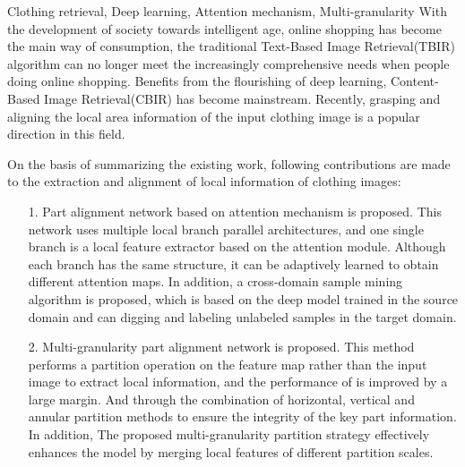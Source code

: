 \documentclass[figurelist,tablelist,algorithmlist,nomlist,masters]{Style/seuthesix}
\begin{document}
\begin{englishabstract}{Clothing retrieval, Deep learning, Attention mechanism, Multi-granularity}
  With the development of society towards intelligent age, online shopping has become the main way of consumption, the traditional Text-Based Image Retrieval(TBIR)
  algorithm can no longer meet the increasingly comprehensive needs when people doing online shopping. Benefits from the flourishing of deep learning, 
  Content-Based Image Retrieval(CBIR) has become mainstream. Recently, grasping and aligning the local area information of the input  clothing image is a 
  popular direction in this field. 
  
  On the basis of summarizing the existing work, following contributions are made to the extraction and alignment of local information 
  of clothing images:
  \begin{itemize}
    \item[1.]Part alignment network based on attention mechanism is proposed. This network uses multiple local branch parallel architectures, 
      and one single branch is a local feature extractor based on the attention module. Although each branch has the same structure, it can be adaptively learned to obtain different attention maps.
      In addition, a cross-domain sample mining algorithm is proposed, which is based on the deep model trained in the source domain and can digging and labeling unlabeled samples in the target domain.
    \item[2.]Multi-granularity part alignment network is proposed. This method performs a partition operation on the feature map rather than the input image to extract local information, 
      and the performance of is improved by a large margin. And through the combination of horizontal, vertical and annular partition methods to ensure the integrity of the key part information.
      In addition, The proposed multi-granularity partition strategy effectively enhances the model by merging local features of different partition scales.
  \end{itemize}
\end{englishabstract}

\tableofcontents
\listofothers

\mainmatter







 
       
\end{document}
